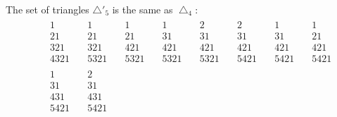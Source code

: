 \begin{ex} 
The set of triangles ${\bigtriangleup}'_5$ is the same as ${\bigtriangleup}_4$:
\begin{eqnarray*}
&&\begin{array}{c}
1\\21\\321\\4321
\end{array}{\quad}
\begin{array}{c}
1\\21\\321\\5321
\end{array}{\quad}
\begin{array}{c}
1\\21\\421\\5321
\end{array}{\quad}
\begin{array}{c}
1\\31\\421\\5321
\end{array}{\quad}
\begin{array}{c}
2\\31\\421\\5321
\end{array}{\quad}
\begin{array}{c}
2\\31\\421\\5421
\end{array}{\quad}
\begin{array}{c}
1\\31\\421\\5421
\end{array}{\quad}
\begin{array}{c}
1\\21\\421\\5421
\end{array}\\
&&\begin{array}{c}
1\\31\\431\\5421
\end{array}{\quad}
\begin{array}{c}
2\\31\\431\\5421

\end{array}
\end{eqnarray*}
\end{ex}

